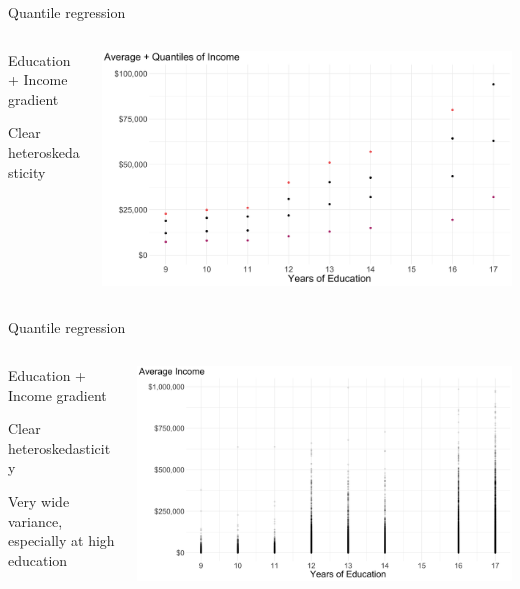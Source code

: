 \documentclass[notes,11pt, aspectratio=169]{beamer}
\newenvironment{wideitemize}{\itemize\addtolength{\itemsep}{10pt}}{\enditemize}
\begin{document}
\begin{frame}{Quantile regression}
  \begin{columns}[T] %
\begin{column}{.3\textwidth}
  \begin{wideitemize}
    \item Education + Income  gradient
  \item Clear heteroskedasticity
    \end{wideitemize}
  \end{column}%
  \hfill%
  \begin{column}{.7\textwidth}
    \includegraphics[width=\linewidth]{avg_income_education_mean.png}
  \end{column}
\end{columns}
\end{frame}

\begin{frame}{Quantile regression}
  \begin{columns}[T] %
    \begin{column}{.3\textwidth}
  \begin{wideitemize}
    \item Education + Income  gradient
    \item Clear heteroskedasticity
    \item Very wide variance, especially at high education
  \end{wideitemize}
  \end{column}%
  \hfill%
  \begin{column}{.7\textwidth}
    \includegraphics[width=\linewidth]{avg_income_education_scatter.png}
  \end{column}
\end{columns}
\end{frame}
\end{document}
